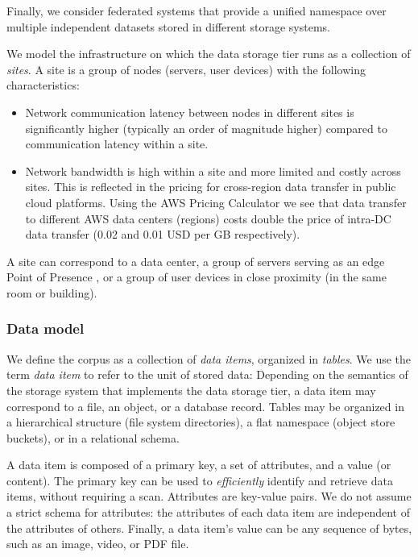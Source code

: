 Finally, we consider federated systems that provide a unified namespace over multiple independent datasets stored in different storage systems.

\medskip
\noindent
We model the infrastructure on which the data storage tier runs as a collection of \textit{sites}.
A site is a group of nodes (servers, user devices) with the following characteristics:
\begin{itemize}
  \item Network communication latency between nodes in different sites is significantly higher (typically an order of
  magnitude higher) \cite{pbailis:hats} compared to communication latency within a site.
  \item Network bandwidth is high within a site and more limited and costly across sites.
  This is reflected in the pricing for cross-region data transfer in public cloud platforms.
  Using the AWS Pricing Calculator \cite{aws:costcalc} we see that data transfer to different AWS data centers
  (regions) costs double the price of intra-DC data transfer (0.02 and 0.01 USD per GB respectively).
\end{itemize}

A site can correspond to a data center, a group of servers serving as an edge Point of Presence \cite{google:infra}, or
a group of user devices in close proximity (in the same room or building).

\subsubsection{Data model}
We define the corpus as a collection of \textit{data items}, organized in \textit{tables}.
We use the term \textit{data item} to refer to the unit of stored data:
Depending on the semantics of the storage system that implements the data storage tier,
a data item may correspond to a file, an object, or a database record.
Tables may be organized in a hierarchical structure (file system directories), a flat namespace (object store buckets),
or in a relational schema.

A data item is composed of a primary key, a set of attributes, and a value (or content).
The primary key can be used to \textit{efficiently} identify and retrieve data items, without requiring a scan.
Attributes are key-value pairs.
We do not assume a strict schema for attributes: the attributes of each data item are independent of the attributes of
others.
Finally, a data item's value can be any sequence of bytes, such as an image, video, or PDF file.

